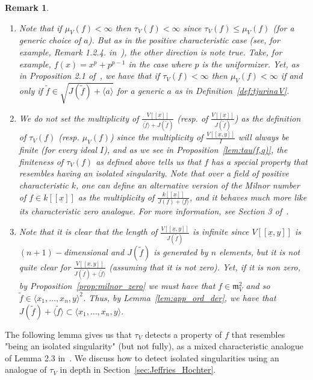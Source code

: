 \documentclass{article}
\newtheorem{remark}[theorem]{Remark}
\newcommand{\maxV}{\mathfrak{m}_V}
\newcommand{\Vx}{V[[\underline{x}]]}
\newcommand{\Vxy}{V[[\underline{x},y]]}
\numberwithin{theorem}{section}
\begin{document}
\begin{remark}\label{rem:tjurina_def}
\begin{enumerate}
    \item \textup{Note that if $\mu_V\left(f\right) < \infty$ then $\tau_V\left(f\right) < \infty$ since $\tau_V\left(f\right) \leq \mu_V\left(f\right)$ (for a generic choice of $a$). But as in the positive characteristic case (see, for example, Remark 1.2.4. in~\cite{boubakri2009hypersurface}), the other direction is note true. Take, for example, $f\left(x\right)= x^p + p^{p-1}$ in the case where $p$ is the uniformizer. Yet, as in Proposition 2.1 of~\cite{hefez2019hypersurface}, we have that if $\tau_V\left(f\right) < \infty$ then $\mu_V\left(f\right) < \infty$ if and only if $\tilde{f} \in \sqrt{J(\tilde{f}) +\langle a \rangle}$ for a generic $a$ as in Definition~\ref{def:tjurinaV}. }%
    \item \textup{We do not set the multiplicity of $\frac{\Vx}{\langle \tilde{f} \rangle + J(\tilde{f})}$ (resp. of $\frac{\Vx}{J(\tilde{f})}$) as the definition of $\tau_V\left(f\right)$ (resp. $\mu_V(f)$) since the multiplicity of $\frac{\Vxy}{I}$ will always be finite (for every ideal $I$), and as we see in Proposition~\ref{lem:tau(f,q)}, the finiteness of $\tau_V\left(f\right)$ as defined above tells us that $f$ has a special property that resembles having an isolated singularity. Note that over a field of positive characteristic $k$, one can define an alternative version of the Milnor number of $f \in k[[\underline{x}]]$ as  the multiplicity of $\frac{k[[\underline{x}]]}{J(f) + \langle f \rangle}$, and it behaves much more like its characteristic zero analogue. For more information, see Section 3 of~\cite{hefez2019hypersurface}.}
    \item \textup{Note that it is clear that the length of $\frac{\Vxy}{J(\tilde{f})}$ is infinite since $\Vxy$ is $(n+1)-$dimensional and $J(\tilde{f})$ is generated by $n$ elements, but it is not quite clear for $\frac{\Vxy}{J(\tilde{f}) + \langle \tilde{f} \rangle}$ (assuming that it is not zero). Yet, if it is non zero, by Proposition~\ref{prop:milnor_zero} we must have that $f\in \maxV^2$ and so $\tilde{f} \in \langle x_1, \dots, x_n, y \rangle^2$. Thus, by Lemma~\ref{lem:app_ord_der}, we have that $J(\tilde{f}) +\langle \tilde{f} \rangle \subset \langle x_1, \dots, x_n, y \rangle$.}
\end{enumerate}
\end{remark}

The following lemma gives us that $\tau_V$ detects a property of $f$ that resembles "being an isolated singularity" (but not fully), as a mixed characteristic analogue of Lemma 2.3 in~\cite{greuel2007introduction}. We discuss how to detect isolated singularities using an analogue of $\tau_V$ in depth in Section~\ref{sec:Jeffries_Hochter}.
\end{document}
